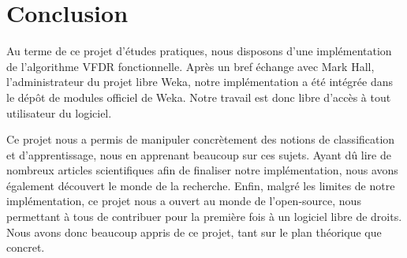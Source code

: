 \section{Conclusion} 
        
       Au terme de ce projet d'études pratiques, nous disposons d'une implémentation de l'algorithme VFDR fonctionnelle. Après un bref échange avec Mark Hall, l'administrateur du projet libre Weka, notre implémentation a été intégrée dans le dépôt de modules officiel de Weka. Notre travail est donc libre d'accès à tout utilisateur du logiciel. 

	   Ce projet nous a permis de manipuler concrètement des notions de classification et d'apprentissage, nous en apprenant beaucoup sur ces sujets. Ayant dû lire de nombreux articles scientifiques afin de finaliser notre implémentation, nous avons également découvert le monde de la recherche. Enfin, malgré les limites de notre implémentation, ce projet nous a ouvert au monde de l'open-source, nous permettant à tous de contribuer pour la première fois à un logiciel libre de droits. Nous avons donc beaucoup appris de ce projet, tant sur le plan théorique que concret.
